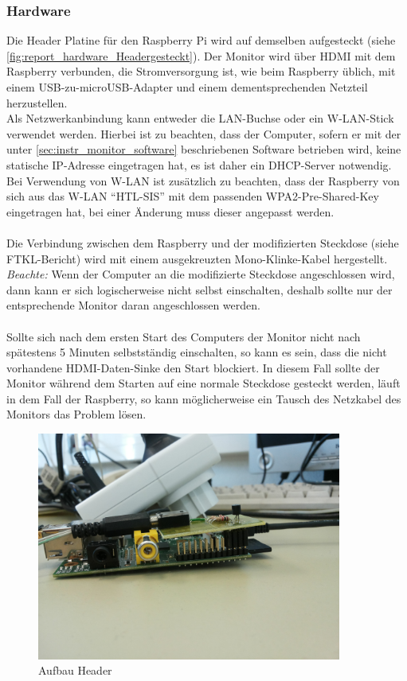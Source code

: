 \subsubsection{Hardware}
Die Header Platine für den Raspberry Pi wird auf demselben aufgesteckt (siehe \autoref{fig:report_hardware_Headergesteckt}). Der Monitor wird über HDMI mit dem Raspberry verbunden, die Stromversorgung ist, wie beim Raspberry üblich, mit einem USB-zu-microUSB-Adapter und einem dementsprechenden Netzteil herzustellen.\\
Als Netzwerkanbindung kann entweder die LAN-Buchse oder ein W-LAN-Stick verwendet werden. Hierbei ist zu beachten, dass der Computer, sofern er mit der unter  \autoref{sec:instr_monitor_software} beschriebenen Software betrieben wird, keine statische IP-Adresse eingetragen hat, es ist daher ein DHCP-Server notwendig. Bei Verwendung von W-LAN ist zusätzlich zu beachten, dass der Raspberry von sich aus das W-LAN \enquote{HTL-SIS} mit dem passenden WPA2-Pre-Shared-Key eingetragen hat, bei einer Änderung muss dieser angepasst werden.\\
\\
Die Verbindung zwischen dem Raspberry und der modifizierten Steckdose (siehe FTKL-Bericht) wird mit einem ausgekreuzten Mono-Klinke-Kabel hergestellt.\\
\textit{Beachte:} Wenn der Computer an die modifizierte Steckdose angeschlossen wird, dann kann er sich logischerweise nicht selbst einschalten, deshalb sollte nur der entsprechende Monitor daran angeschlossen werden.\\
\\
Sollte sich nach dem ersten Start des Computers der Monitor nicht nach spätestens 5 Minuten selbstständig einschalten, so kann es sein, dass die nicht vorhandene HDMI-Daten-Sinke den Start blockiert. In diesem Fall sollte der Monitor während dem Starten auf eine normale Steckdose gesteckt werden, läuft in dem Fall der Raspberry, so kann möglicherweise ein Tausch des Netzkabel des Monitors das Problem lösen.

\begin{figure}[H]
\centering
\includegraphics[keepaspectratio=true, width=10cm]{images/rpi/rpi_header_gesteckt.jpg}
\caption{Aufbau Header}
\label{fig:report_hardware_Headergesteckt}
\end{figure}

